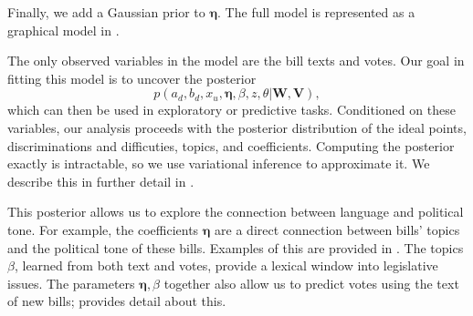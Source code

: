Finally, we add a Gaussian prior to $\bm \eta$.  The full model is
represented as a graphical model in .

The only observed variables in the model are the bill texts and votes.
Our goal in fitting this model is to uncover the posterior
\begin{equation}
  p(a_d, b_d, x_u, \bm \eta, \beta, z, \theta | \bm W, \bm V), \label{eq:posterior}
\end{equation}
which can then be used in exploratory or predictive tasks.
Conditioned on these variables, our analysis proceeds with the
posterior distribution of the ideal points, discriminations and
difficuties, topics, and coefficients. Computing the posterior exactly
is intractable, so we use variational inference to approximate it.  We
describe this in further detail in .


This posterior allows us to explore the connection between language
and political tone.  For example, the coefficients $\bm \eta$ are a
direct connection between bills' topics and the political tone of
these bills. Examples of this are provided in .
The topics $\beta$, learned from both text and votes, provide a
lexical window into legislative issues.  The parameters $\bm \eta,
\beta$ together also allow us to predict votes using the text of new
bills;  provides detail about this.



